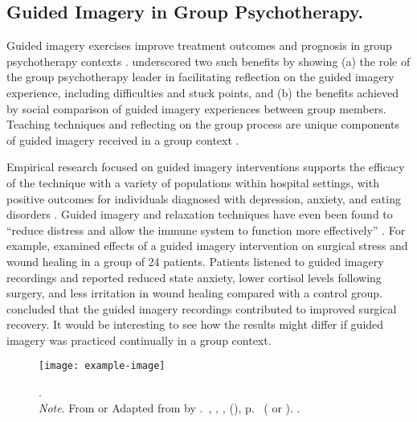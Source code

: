 \subsection*{Guided Imagery in Group Psychotherapy.}

Guided imagery exercises improve treatment outcomes and prognosis in group psychotherapy contexts \citep{skovholt1987imagery}. \citet{lange1982guided} underscored two such benefits by showing (a) the role of the group psychotherapy leader in facilitating reflection on the guided imagery experience, including difficulties and stuck points, and (b) the benefits achieved by social comparison of guided imagery experiences between group members. Teaching techniques and reflecting on the group process are unique components of guided imagery received in a group context \citep{yalom2005theory}.

Empirical research focused on guided imagery interventions supports the efficacy of the technique with a variety of populations within hospital settings, with positive outcomes for individuals diagnosed with depression, anxiety, and eating disorders \citep{utay2006review}. Guided imagery and relaxation techniques have even been found to “reduce distress and allow the immune system to function more effectively” \citep[p.~850]{trakhtenberg2008imagery}. For example, \citet{holden-lund1988imagery} examined effects of a guided imagery intervention on surgical stress and wound healing in a group of 24 patients. Patients listened to guided imagery recordings and reported reduced state anxiety, lower cortisol levels following surgery, and less irritation in wound healing compared with a control group. \citeauthor{holden-lund1988imagery} concluded that the guided imagery recordings contributed to improved surgical recovery. It would be interesting to see how the results might differ if guided imagery was practiced continually in a group context.

\begin{figure*}[t]
    \centering
    \texttt{[image: example-image]}
    \caption{
        .\\
        \indent\emph{Note}. From {\color{RedOrange} or} Adapted from  by .~, , \emph{, }(), p.~ ( {\color{RedOrange} or} ). .
        }
    \label{fig: large-image}
\end{figure*}

